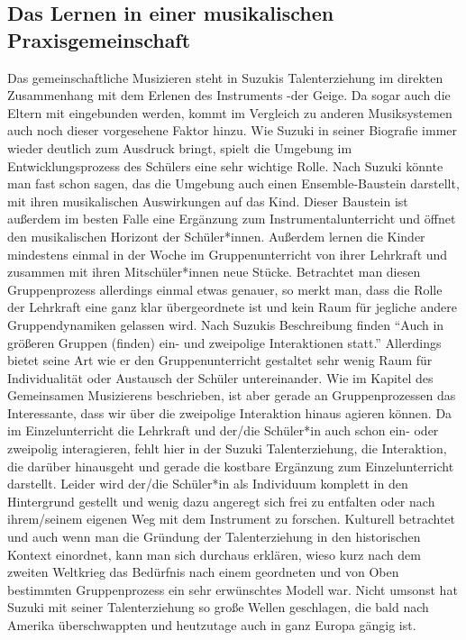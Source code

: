 \subsection{Das Lernen in einer musikalischen Praxisgemeinschaft}
Das gemeinschaftliche Musizieren steht in Suzukis Talenterziehung im direkten
Zusammenhang mit dem Erlenen des Instruments -der Geige. Da sogar auch die
Eltern mit eingebunden werden, kommt im Vergleich zu anderen Musiksystemen auch
noch dieser vorgesehene Faktor hinzu. Wie Suzuki in seiner Biografie immer
wieder deutlich zum Ausdruck bringt, spielt die Umgebung im Entwicklungsprozess
des Schülers eine sehr wichtige Rolle. Nach Suzuki könnte man fast schon sagen,
das die Umgebung auch einen Ensemble-Baustein darstellt, mit ihren musikalischen
Auswirkungen auf das Kind. Dieser Baustein ist außerdem im besten Falle eine
Ergänzung zum Instrumentalunterricht und öffnet den musikalischen Horizont der
Schüler*innen. Außerdem lernen die Kinder mindestens einmal in der Woche im
Gruppenunterricht von ihrer Lehrkraft und zusammen mit ihren Mitschüler*innen
neue Stücke. Betrachtet man diesen Gruppenprozess allerdings einmal etwas
genauer, so merkt man, dass die Rolle der Lehrkraft eine ganz klar übergeordnete
ist und kein Raum für jegliche andere Gruppendynamiken gelassen wird. Nach
Suzukis Beschreibung finden \enquote{Auch in größeren Gruppen (finden) ein- und
zweipolige Interaktionen statt.} \autocite[30]{suzuki:erziehung_ist_liebe}
Allerdings bietet seine Art wie er den Gruppenunterricht gestaltet sehr wenig
Raum für Individualität oder Austausch der Schüler untereinander. Wie im Kapitel
des Gemeinsamen Musizierens beschrieben, ist aber gerade an Gruppenprozessen das
Interessante, dass wir über die zweipolige Interaktion hinaus agieren können. Da
im Einzelunterricht die Lehrkraft und der/die Schüler*in auch schon ein- oder
zweipolig interagieren, fehlt hier in der Suzuki Talenterziehung, die
Interaktion, die darüber hinausgeht und gerade die kostbare Ergänzung zum
Einzelunterricht darstellt. Leider wird der/die Schüler*in als Individuum
komplett in den Hintergrund gestellt und wenig dazu angeregt sich frei zu
entfalten oder nach ihrem/seinem eigenen Weg mit dem Instrument zu forschen.
Kulturell betrachtet und auch wenn man die Gründung der Talenterziehung in den
historischen Kontext einordnet, kann man sich durchaus erklären, wieso kurz nach
dem zweiten Weltkrieg das Bedürfnis nach einem geordneten und von Oben
bestimmten Gruppenprozess ein sehr erwünschtes Modell war. Nicht umsonst hat
Suzuki mit seiner Talenterziehung so große Wellen geschlagen, die bald nach
Amerika überschwappten und heutzutage auch in ganz Europa gängig ist.



